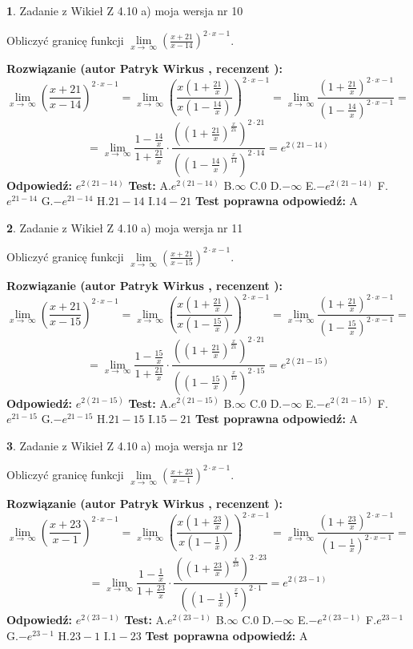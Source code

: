 \documentclass[12pt, a4paper]{article}
\theoremstyle{definition} %
\newtheorem{zad}{}
\newcommand{\zadStart}[1]{\begin{zad}#1\newline}
\newcommand{\zadStop}{\end{zad}}
\newcommand{\rozwStart}[2]{\noindent \textbf{Rozwiązanie (autor #1 , recenzent #2): }\newline}
\newcommand{\rozwStop}{\newline}
\newcommand{\odpStart}{\noindent \textbf{Odpowiedź:}\newline}
\newcommand{\odpStop}{\newline}
\newcommand{\testStart}{\noindent \textbf{Test:}\newline}
\newcommand{\testStop}{\newline}
\newcommand{\kluczStart}{\noindent \textbf{Test poprawna odpowiedź:}\newline}
\newcommand{\kluczStop}{\newline}
\begin{document}
\zadStart{Zadanie z Wikieł Z 4.10 a) moja wersja nr 10}


Obliczyć granicę funkcji  $\lim\limits_{x\to\ \infty}(\frac{x+21}{x-14})^{2\cdot x-1}$.
\zadStop
\rozwStart{Patryk Wirkus}{}
$$\lim\limits_{x\to\ \infty}(\frac{x+21}{x-14})^{2\cdot x-1} = \lim\limits_{x\to\ \infty}(\frac{x(1+\frac{21}{x})}{x(1-\frac{14}{x})})^{2\cdot x-1}=\lim\limits_{x\to\ \infty}\frac{(1+\frac{21}{x})^{2\cdot x-1}}{(1-\frac{14}{x})^{2\cdot x-1}}=$$
$$=\lim\limits_{x\to\ \infty}\frac{1-\frac{14}{x}}{1+\frac{21}{x}}\cdot\frac{((1+\frac{21}{x})^{\frac{x}{21}})^{2\cdot21}}{((1-\frac{14}{x})^{\frac{x}{14}})^{2\cdot14}}=e^{2(21-14)}$$
\rozwStop
\odpStart
$e^{2(21-14)}$
\odpStop
\testStart
A.$e^{2(21-14)}$ B.$\infty$ C.$0$ D.$-\infty$ E.$-e^{2(21-14)}$
F.$e^{21-14}$ G.$-e^{21-14}$
H.$21-14$
I.$14-21$
\testStop
\kluczStart
A
\kluczStop



\zadStart{Zadanie z Wikieł Z 4.10 a) moja wersja nr 11}


Obliczyć granicę funkcji  $\lim\limits_{x\to\ \infty}(\frac{x+21}{x-15})^{2\cdot x-1}$.
\zadStop
\rozwStart{Patryk Wirkus}{}
$$\lim\limits_{x\to\ \infty}(\frac{x+21}{x-15})^{2\cdot x-1} = \lim\limits_{x\to\ \infty}(\frac{x(1+\frac{21}{x})}{x(1-\frac{15}{x})})^{2\cdot x-1}=\lim\limits_{x\to\ \infty}\frac{(1+\frac{21}{x})^{2\cdot x-1}}{(1-\frac{15}{x})^{2\cdot x-1}}=$$
$$=\lim\limits_{x\to\ \infty}\frac{1-\frac{15}{x}}{1+\frac{21}{x}}\cdot\frac{((1+\frac{21}{x})^{\frac{x}{21}})^{2\cdot21}}{((1-\frac{15}{x})^{\frac{x}{15}})^{2\cdot15}}=e^{2(21-15)}$$
\rozwStop
\odpStart
$e^{2(21-15)}$
\odpStop
\testStart
A.$e^{2(21-15)}$ B.$\infty$ C.$0$ D.$-\infty$ E.$-e^{2(21-15)}$
F.$e^{21-15}$ G.$-e^{21-15}$
H.$21-15$
I.$15-21$
\testStop
\kluczStart
A
\kluczStop



\zadStart{Zadanie z Wikieł Z 4.10 a) moja wersja nr 12}


Obliczyć granicę funkcji  $\lim\limits_{x\to\ \infty}(\frac{x+23}{x-1})^{2\cdot x-1}$.
\zadStop
\rozwStart{Patryk Wirkus}{}
$$\lim\limits_{x\to\ \infty}(\frac{x+23}{x-1})^{2\cdot x-1} = \lim\limits_{x\to\ \infty}(\frac{x(1+\frac{23}{x})}{x(1-\frac{1}{x})})^{2\cdot x-1}=\lim\limits_{x\to\ \infty}\frac{(1+\frac{23}{x})^{2\cdot x-1}}{(1-\frac{1}{x})^{2\cdot x-1}}=$$
$$=\lim\limits_{x\to\ \infty}\frac{1-\frac{1}{x}}{1+\frac{23}{x}}\cdot\frac{((1+\frac{23}{x})^{\frac{x}{23}})^{2\cdot23}}{((1-\frac{1}{x})^{\frac{x}{1}})^{2\cdot1}}=e^{2(23-1)}$$
\rozwStop
\odpStart
$e^{2(23-1)}$
\odpStop
\testStart
A.$e^{2(23-1)}$ B.$\infty$ C.$0$ D.$-\infty$ E.$-e^{2(23-1)}$
F.$e^{23-1}$ G.$-e^{23-1}$
H.$23-1$
I.$1-23$
\testStop
\kluczStart
A
\kluczStop
\end{document}
